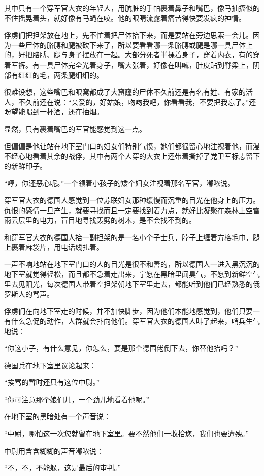 其中只有一个穿军官大衣的年轻人，用肮脏的手帕裹着鼻子和嘴巴，像马抽搐似的不住摇晃着头，就好像有马蝇在咬。他的眼睛流露着痛苦得快要发疯的神情。

俘虏们把担架放在地上，先不忙着把尸体抬下来，而是要站在旁边思索一会儿。因为一些尸体的胳膊和腿被砍下来了，所以要看看哪一条胳膊或腿是哪一具尸体上的，好把胳膊、腿与身子摆放在一起。大部分死者半裸着身子，穿着内衣，有的穿着军裤。有一具尸体完全光着身子，嘴大张着，好像在叫喊，肚皮贴到脊梁上，阴部有红红的毛，两条腿细细的。

很难设想，这些嘴巴和眼窝都成了大窟窿的尸体不久前还是有名有姓、有家的活人，不久前还在说：“亲爱的，好姑娘，吻吻我吧，你看看我，不要把我忘了。”还盼望能喝到一杯酒，还在抽烟。

显然，只有裹着嘴巴的军官能感觉到这一点。

但偏偏是他让站在地下室门口的妇女们特别气愤，她们都很留心地注视着他，而漫不经心地看着其余的战俘，其中有两个人穿的大衣上还带着撕掉了党卫军标志留下的新鲜印子。

“哼，你还恶心呢。”一个领着小孩子的矮个妇女注视着那名军官，嘟哝说。

穿军官大衣的德国人感觉到一位苏联妇女那种缓慢而沉重的目光在他身上的压力。仇恨的感情一旦产生，就要寻找而且一定要找到着力点，就好比凝聚在森林上空雷雨云层里的电力，盲目地寻找轰劈的树木，是不会找不到的。

和穿军官大衣的德国人抬一副担架的是一名小个子士兵，脖子上缠着方格毛巾，腿上裹着麻袋片，用电话线扎着。

一声不响地站在地下室门口的人的目光是很不和善的，所以德国人一进入黑沉沉的地下室就觉得轻松，而且都不急着走出来，宁愿在黑暗里闻臭气，不愿到新鲜空气里去见阳光，每次德国人带着空担架朝地下室里走去，都能听到他们已经熟悉的俄罗斯人的骂声。

俘虏们在向地下室走的时候，并不加快脚步，因为他们本能地感觉到，他们只要一有什么急促的动作，人群就会扑向他们。穿军官大衣的德国人叫了起来，哨兵生气地说：

“你这小子，有什么意见，你怎么，要是那个德国佬倒下去，你替他抬吗？”

德国兵在地下室里议论起来：

“挨骂的暂时还只有这位中尉。”

“你可注意那个娘们儿，一个劲儿地看着他呢。”

在地下室的黑暗处有一个声音说：

“中尉，哪怕这一次您就留在地下室里。要不然他们一收拾您，我们也要遭殃。”

中尉用含含糊糊的声音嘟哝说：

“不，不，不能躲，这是最后的审判。”

